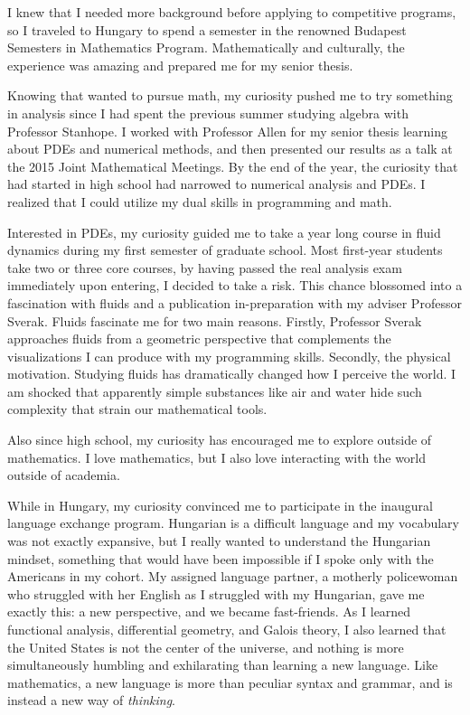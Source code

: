 \documentclass[12pt]{article}
\begin{document}
I knew that I needed more background before applying to competitive programs, so I traveled to Hungary to spend a semester in the renowned Budapest Semesters in Mathematics Program. Mathematically and culturally, the experience was amazing and prepared me for my senior thesis.

Knowing that wanted to pursue math, my curiosity pushed me to try something in analysis since I had spent the previous summer studying algebra with Professor Stanhope. I worked with Professor Allen for my senior thesis learning about PDEs and numerical methods, and then presented our results as a talk at the 2015 Joint Mathematical Meetings. By the end of the year, the  curiosity that had started in high school had narrowed to numerical analysis and PDEs. I realized that I could utilize my dual skills in programming and math. 

Interested in PDEs, my curiosity guided me to take a year long course in fluid dynamics during my first semester of graduate school. Most first-year students take two or three core courses, by having passed the real analysis exam immediately upon entering, I decided to take a risk. This chance blossomed into a fascination with fluids and a publication in-preparation with my adviser Professor Sverak. Fluids fascinate me for two main reasons. Firstly, Professor Sverak approaches fluids from a geometric perspective that complements the visualizations I can produce with my programming skills. Secondly, the physical motivation. Studying fluids has dramatically changed how I perceive the world. I am shocked that apparently simple substances like air and water hide such complexity that strain our mathematical tools. 

Also since high school, my curiosity has encouraged me to explore outside of mathematics. I love mathematics, but I also love interacting with the world outside of academia.

While in Hungary, my curiosity convinced me to participate in the inaugural language exchange program. Hungarian is a difficult language and my vocabulary was not exactly expansive, but I really wanted to understand the Hungarian mindset, something that would have been impossible if I spoke only with the Americans in my cohort. My assigned language partner, a motherly policewoman who struggled with her English as I struggled with my Hungarian, gave me exactly this: a new perspective, and we became fast-friends. As I learned functional analysis, differential geometry, and Galois theory, I also learned that the United States is not the center of the universe, and nothing is more simultaneously humbling and exhilarating than learning a new language. Like mathematics, a new language is more than peculiar syntax and grammar, and is instead a new way of \textit{thinking}.  
\end{document}
